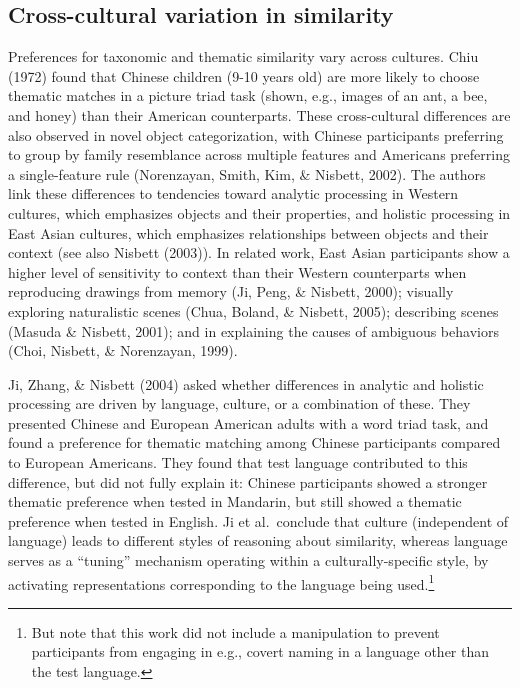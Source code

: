 \documentclass[10pt, letterpaper]{article}
\begin{document}
\hypertarget{cross-cultural-variation-in-similarity}{%
\subsection{Cross-cultural variation in
similarity}\label{cross-cultural-variation-in-similarity}}

Preferences for taxonomic and thematic similarity vary across cultures.
Chiu (1972) found that Chinese children (9-10 years old) are more likely
to choose thematic matches in a picture triad task (shown, e.g., images
of an ant, a bee, and honey) than their American counterparts. These
cross-cultural differences are also observed in novel object
categorization, with Chinese participants preferring to group by family
resemblance across multiple features and Americans preferring a
single-feature rule (Norenzayan, Smith, Kim, \& Nisbett, 2002). The
authors link these differences to tendencies toward analytic processing
in Western cultures, which emphasizes objects and their properties, and
holistic processing in East Asian cultures, which emphasizes
relationships between objects and their context (see also Nisbett
(2003)). In related work, East Asian participants show a higher level of
sensitivity to context than their Western counterparts when reproducing
drawings from memory (Ji, Peng, \& Nisbett, 2000); visually exploring
naturalistic scenes (Chua, Boland, \& Nisbett, 2005); describing scenes
(Masuda \& Nisbett, 2001); and in explaining the causes of ambiguous
behaviors (Choi, Nisbett, \& Norenzayan, 1999).

Ji, Zhang, \& Nisbett (2004) asked whether differences in analytic and
holistic processing are driven by language, culture, or a combination of
these. They presented Chinese and European American adults with a word
triad task, and found a preference for thematic matching among Chinese
participants compared to European Americans. They found that test
language contributed to this difference, but did not fully explain it:
Chinese participants showed a stronger thematic preference when tested
in Mandarin, but still showed a thematic preference when tested in
English. Ji et al.~conclude that culture (independent of language) leads
to different styles of reasoning about similarity, whereas language
serves as a ``tuning'' mechanism operating within a culturally-specific
style, by activating representations corresponding to the language being
used.\footnote{But note that this work did not include a manipulation to
  prevent participants from engaging in e.g., covert naming in a
  language other than the test language.}
\end{document}
